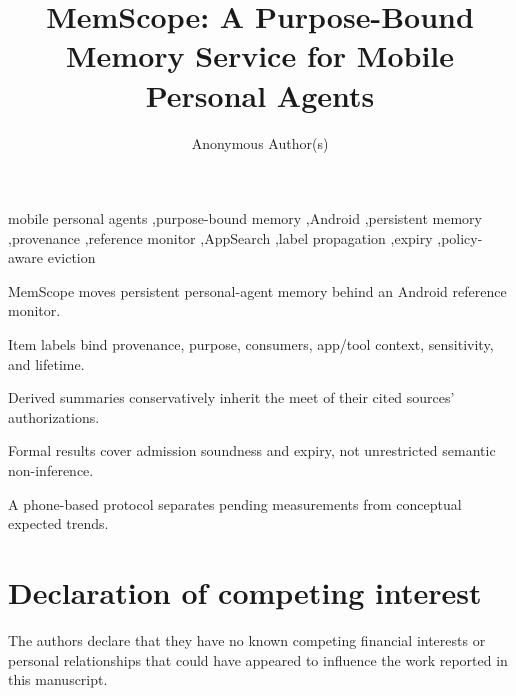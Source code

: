 \documentclass[preprint,12pt,authoryear]{elsarticle}
\theoremstyle{remark}
\begin{document}
\begin{frontmatter}

\title{MemScope: A Purpose-Bound Memory Service for Mobile Personal Agents}

\author[inst1]{Anonymous Author(s)}

\begin{abstract}

\end{abstract}

\begin{keyword}
mobile personal agents \sep purpose-bound memory \sep Android \sep persistent memory \sep provenance \sep reference monitor \sep AppSearch \sep label propagation \sep expiry \sep policy-aware eviction
\end{keyword}

\end{frontmatter}

\begin{highlights}
\item MemScope moves persistent personal-agent memory behind an Android reference monitor.
\item Item labels bind provenance, purpose, consumers, app/tool context, sensitivity, and lifetime.
\item Derived summaries conservatively inherit the meet of their cited sources' authorizations.
\item Formal results cover admission soundness and expiry, not unrestricted semantic non-inference.
\item A phone-based protocol separates pending measurements from conceptual expected trends.
\end{highlights}

















\appendix





\section*{Declaration of competing interest}
The authors declare that they have no known competing financial interests or personal relationships that could have appeared to influence the work reported in this manuscript.
\end{document}
